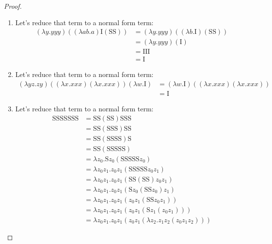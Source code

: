 \documentclass[11pt]{article}
\theoremstyle{definition}
\theoremstyle{remark}
\theoremstyle{remark}
\theoremstyle{definition}
\renewcommand{\S}{\pmb{\mathrm{S}}}
\newcommand{\I}{\pmb{\mathrm{I}}}
\begin{document}
\begin{proof}
  \begin{enumerate}
    \item Let's reduce that term to a normal form term:
          \begin{align*}
            (\lambda y.yyy)((\lambda ab.a)\I(\S\S)) &= (\lambda y.yyy)((\lambda b.\I)
                                                      (\S\S)) \\
                                                    &= (\lambda y.yyy)(\I) \\
                                                    &= \I\I\I \\
                                                    & = \I
          \end{align*}
    \item Let's reduce that term to a normal form term:
          \begin{align*}
            (\lambda yz.zy)((\lambda x.xxx)(\lambda x.xxx))(\lambda w. \I)
            &= (\lambda w. \I)((\lambda x.xxx)(\lambda x.xxx)) \quad \\
            &= \I
          \end{align*}

    \item Let's reduce that term to a normal form term:
          \begin{align*}
            \S\S\S\S\S\S\S &= \S\S(\S\S)\S\S\S \\
                           &= \S\S(\S\S\S)\S\S \\
                           &= \S\S(\S\S\S\S)\S \\
                           &= \S\S(\S\S\S\S\S) \\
                           &= \lambda z_0. \S z_0(\S\S\S\S\S z_0) \\
                           &= \lambda z_0z_1.z_0z_1(\S\S\S\S\S z_0z_1) \\
                           &= \lambda z_0z_1.z_0z_1(\S\S(\S\S)z_0z_1) \\
                           &= \lambda z_0z_1.z_0z_1(\S z_0(\S\S z_0)z_1) \\
                           &= \lambda z_0z_1. z_0z_1(z_0z_1(\S\S z_0z_1)) \\
                           &= \lambda z_0z_1. z_0z_1(z_0z_1(\S z_1(z_0z_1))) \\
                           &= \lambda z_0z_1. z_0z_1(z_0z_1(\lambda z_2. z_1z_2(z_0z_1z_2)))
          \end{align*}
  \end{enumerate}
\end{proof}
\end{document}
